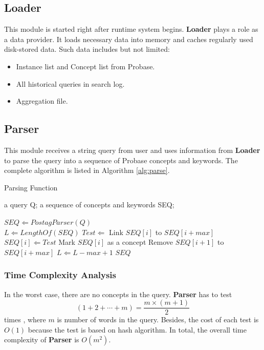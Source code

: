 \subsection{Loader}
This module is started right after runtime system begins. \textbf{Loader} plays a role as a data provider. It loads necessary data into memory and caches regularly used disk-stored data. Such data includes but not limited:

\begin{itemize}
  \item Instance list and Concept list from Probase.
  \item All historical queries in search log.
  \item Aggregation file.
\end{itemize}

\subsection{Parser}
This module receives a string query from user and uses information from \textbf{Loader} to parse the query into a sequence of Probase concepts and keywords. The complete algorithm is listed in Algorithm \ref{alg:parse}.

\begin{algorithm}
\caption{Parsing Function}
\label{alg:parse}
\begin{algorithmic} [1]
  \REQUIRE a query Q;
  \ENSURE a sequence of concepts and keywords SEQ;

  \STATE $SEQ \Leftarrow PostagParser(Q)$ \\
  \STATE $L \Leftarrow LengthOf(SEQ)$
        \STATE $Test \Leftarrow$ Link $SEQ[i]$ to $SEQ[i+max]$
      \ENDIF
        \STATE $SEQ[i] \Leftarrow Test$
        \STATE Mark $SEQ[i]$ as a concept
        \STATE Remove $SEQ[i+1]$ to $SEQ[i+max]$
        \STATE $L \Leftarrow L - max + 1$
      \ENDIF
    \ENDFOR
  \ENDFOR
  \RETURN $SEQ$
\end{algorithmic}
\end{algorithm}

\subsubsection{Time Complexity Analysis}
In the worst case, there are no concepts in the query. \textbf{Parser} has to test
\[(1+2+ \cdots +m) = \frac {m \times (m+1)} {2}\] times
, where $m$ is number of words in the query. Besides, the cost of each test is $O(1)$ because the test is based on hash algorithm. In total, the overall time complexity of \textbf{Parser} is $O(m^2)$.

